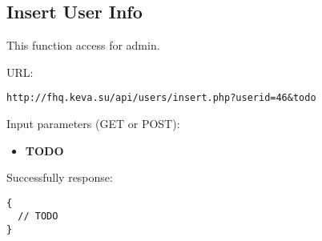 \subsection{Insert User Info}
\par

This function access for admin.

URL:
\begin{Verbatim}[frame=single]
http://fhq.keva.su/api/users/insert.php?userid=46&todo
\end{Verbatim}

Input parameters (GET or POST):
\begin{itemize}
  \item \textbf{TODO}
\end{itemize}

Successfully response:  \\
\begin{Verbatim}[frame=single]
{
  // TODO
}
\end{Verbatim}

~
